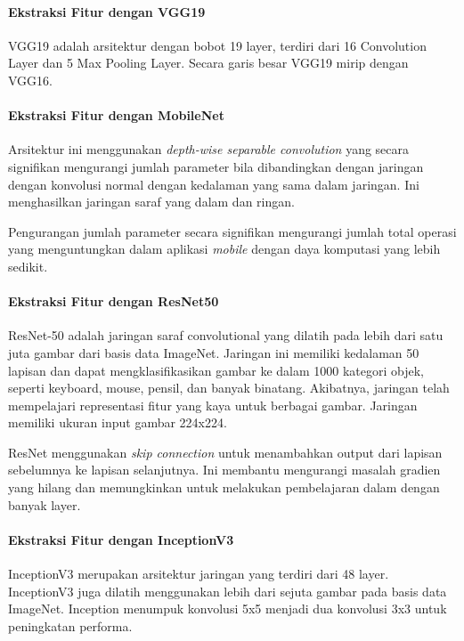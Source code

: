\paragraph{Ekstraksi Fitur dengan VGG19}
\mbox{}
\par VGG19 adalah arsitektur dengan bobot 19 layer, terdiri dari 16 Convolution Layer dan 5 Max Pooling Layer. Secara garis besar VGG19 mirip dengan VGG16. 

\paragraph{Ekstraksi Fitur dengan MobileNet}
\mbox{}
\par Arsitektur ini menggunakan \textit{depth-wise separable convolution} yang secara signifikan mengurangi jumlah parameter bila dibandingkan dengan jaringan dengan konvolusi normal dengan kedalaman yang sama dalam jaringan. Ini menghasilkan jaringan saraf yang dalam dan ringan. 
\par Pengurangan jumlah parameter secara signifikan mengurangi jumlah total operasi yang menguntungkan dalam aplikasi \textit{mobile} dengan daya komputasi yang lebih sedikit.

\paragraph{Ekstraksi Fitur dengan ResNet50}
\mbox{}
\par ResNet-50 adalah jaringan saraf convolutional yang dilatih pada lebih dari satu juta gambar dari basis data ImageNet. Jaringan ini memiliki kedalaman 50 lapisan dan dapat mengklasifikasikan gambar ke dalam 1000 kategori objek, seperti keyboard, mouse, pensil, dan banyak binatang. Akibatnya, jaringan telah mempelajari representasi fitur yang kaya untuk berbagai gambar. Jaringan memiliki ukuran input gambar 224x224.

\par ResNet menggunakan \textit{skip connection} untuk menambahkan output dari lapisan sebelumnya ke lapisan selanjutnya. Ini membantu mengurangi masalah gradien yang hilang dan memungkinkan untuk melakukan pembelajaran dalam dengan banyak layer.

\paragraph{Ekstraksi Fitur dengan InceptionV3}
\mbox{}
\par InceptionV3 merupakan arsitektur jaringan yang terdiri dari 48 layer. InceptionV3 juga dilatih menggunakan lebih dari sejuta gambar pada basis data ImageNet. Inception menumpuk konvolusi 5x5 menjadi dua konvolusi 3x3 untuk peningkatan performa.

